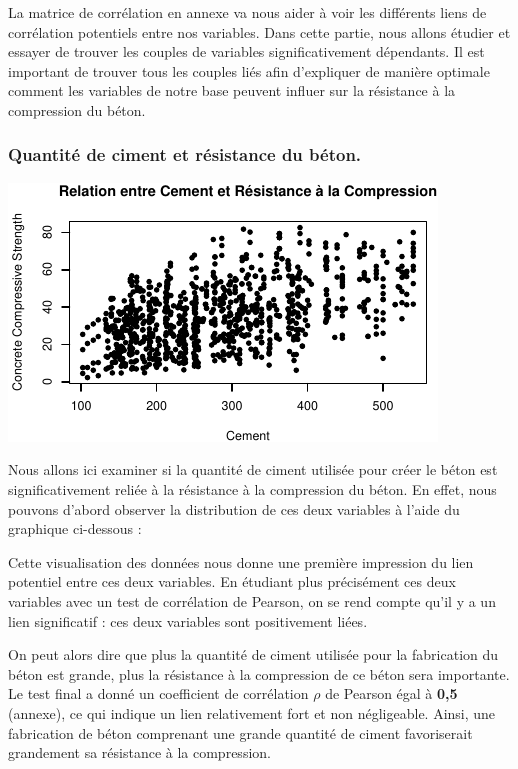 \documentclass[
  12pt,
]{article}
\begin{document}
La matrice de corrélation en annexe va nous aider à voir les différents
liens de corrélation potentiels entre nos variables. Dans cette partie,
nous allons étudier et essayer de trouver les couples de variables
significativement dépendants. Il est important de trouver tous les
couples liés afin d'expliquer de manière optimale comment les variables
de notre base peuvent influer sur la résistance à la compression du
béton.

\subsubsection{Quantité de ciment et résistance du
béton.}\label{quantituxe9-de-ciment-et-ruxe9sistance-du-buxe9ton.}

\begin{center}\includegraphics{rmd_final_files/figure-latex/unnamed-chunk-10-1} \end{center}

Nous allons ici examiner si la quantité de ciment utilisée pour créer le
béton est significativement reliée à la résistance à la compression du
béton. En effet, nous pouvons d'abord observer la distribution de ces
deux variables à l'aide du graphique ci-dessous :

Cette visualisation des données nous donne une première impression du
lien potentiel entre ces deux variables. En étudiant plus précisément
ces deux variables avec un test de corrélation de Pearson, on se rend
compte qu'il y a un lien significatif : ces deux variables sont
positivement liées.

On peut alors dire que plus la quantité de ciment utilisée pour la
fabrication du béton est grande, plus la résistance à la compression de
ce béton sera importante. Le test final a donné un coefficient de
corrélation \(\rho\) de Pearson égal à \textbf{0,5} (annexe), ce qui
indique un lien relativement fort et non négligeable. Ainsi, une
fabrication de béton comprenant une grande quantité de ciment
favoriserait grandement sa résistance à la compression.
\end{document}
